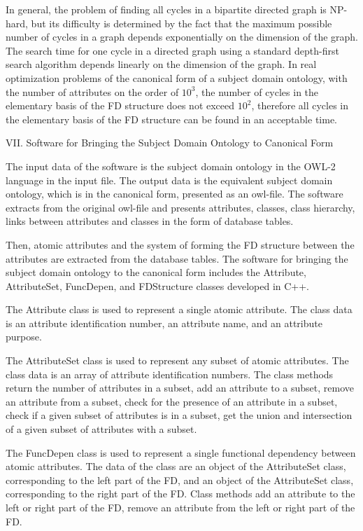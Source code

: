 \documentclass{scndocument}
\begin{document}
{In general, the problem of finding all cycles in a bipartite directed graph is NP-hard, but its difficulty is determined by the fact that the maximum possible number of cycles in a graph depends exponentially on the dimension of the graph. The search time for one cycle in a directed graph using a standard depth-first search algorithm depends linearly on the dimension of the graph. In real optimization problems of the canonical form of a subject domain ontology, with the number of attributes on the order of $10^3$, the number of cycles in the elementary basis of the FD structure does not exceed $10^2$, therefore all cycles in the elementary basis of the FD structure can be found in an acceptable time.}
\newline
\begin{center}
{VII. Software for Bringing the Subject Domain Ontology to Canonical Form} \\
\end{center}

{The input data of the software is the subject domain ontology in the OWL-2 language in the input file. The output data is the equivalent subject domain ontology, which is in the canonical form, presented as an owl-file. The software extracts from the original owl-file and presents attributes, classes, class hierarchy, links between attributes and classes in the form of database tables.}

{Then, atomic attributes and the system of forming the FD structure between the attributes are extracted from the database tables. The software for bringing the subject domain ontology to the canonical form includes the Attribute, AttributeSet, FuncDepen, and FDStructure classes developed in C++.}

{The Attribute class is used to represent a single atomic attribute. The class data is an attribute identification number, an attribute name, and an attribute purpose.}

{The AttributeSet class is used to represent any subset of atomic attributes. The class data is an array of attribute identification numbers. The class methods return the number of attributes in a subset, add an attribute to a subset, remove an attribute from a subset, check for the presence of an attribute in a subset, check if a given subset of attributes is in a subset, get the union and intersection of a given subset of attributes with a subset.}

{The FuncDepen class is used to represent a single functional dependency between atomic attributes. The data of the class are an object of the AttributeSet class, corresponding to the left part of the FD, and an object of the AttributeSet class, corresponding to the right part of the FD. Class methods add an attribute to the left or right part of the FD, remove an attribute from the left or right part of the FD.}
\end{document}
